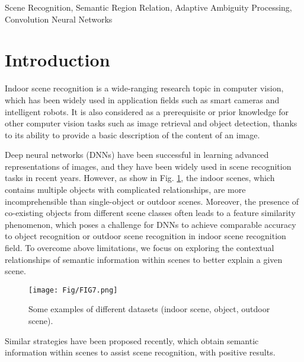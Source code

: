 \documentclass[conference]{IEEEtran}
\begin{document}
\begin{IEEEkeywords}
Scene Recognition, Semantic Region Relation, Adaptive Ambiguity Processing, Convolution Neural Networks
\end{IEEEkeywords}

\makeatletter
\renewcommand\footnoterule{\kern-3\p@
  \hrule width \columnwidth
  \kern2.6\p@}
\makeatother

\section{Introduction}
Indoor scene recognition is a wide-ranging research topic in computer vision, which has been widely used in application fields such as smart cameras and intelligent robots. It is also considered as a prerequisite or prior knowledge for other computer vision tasks such as image retrieval and object detection, thanks to its ability to provide a basic description of the content of an image\cite{ref1}.

Deep neural networks (DNNs) have been successful in learning advanced representations of images, and they have been widely used in scene recognition tasks in recent years. However, as show in Fig. \ref{Fig7},  the indoor scenes, which contains multiple objects with complicated relationships,  are more incomprehensible than single-object or outdoor scenes. 
Moreover, the presence of co-existing objects from different scene classes often leads to a feature similarity phenomenon, which poses a challenge for DNNs to achieve comparable accuracy to object recognition or outdoor scene recognition in indoor scene recognition field. To overcome above limitations, we focus on exploring the contextual relationships of semantic information within scenes to better explain a given scene.

\begin{figure}[tbp]
    \centering
    \texttt{[image: Fig/FIG7.png]}
    \caption{Some examples of different datasets (indoor scene, object, outdoor scene).}
    \label{Fig7}
\end{figure}

Similar strategies have been proposed recently\cite{ref7,ref18,ref23,ref17,ref19}, which obtain semantic information within scenes to assist scene recognition, with positive results. 
\end{document}
